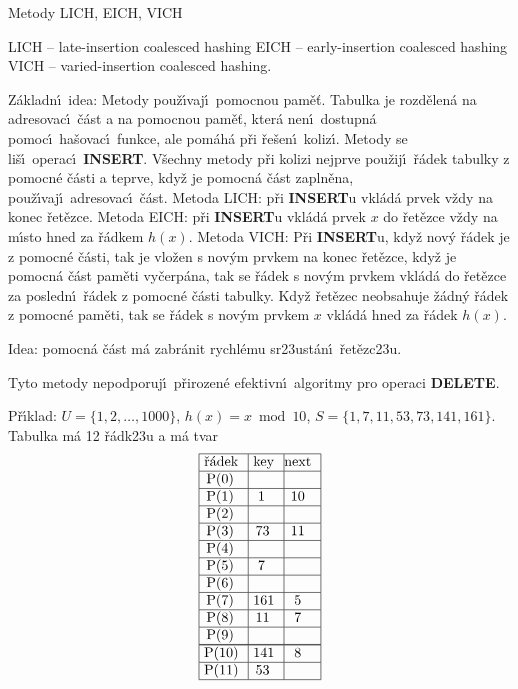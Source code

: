 \subhead
Metody LICH, EICH, VICH
\endsubhead

\phantom{---}LICH -- late-insertion coalesced hashing\newline 
\phantom{---}EICH -- early-insertion coalesced hashing\newline 
\phantom{---}VICH -- varied-insertion coalesced hashing.
\medskip

\flushpar Z\'akladn\'\i\ idea: Metody pou\v z\'\i vaj\'\i\ pomocnou pam\v e\v t. 
Tabulka je rozd\v elen\'a na adresovac\'\i\ \v c\'ast a na pomocnou 
pam\v e\v t, kter\'a nen\'\i\ dostupn\'a pomoc\'\i\ ha\v sovac\'\i\ funkce, 
ale pom\'ah\'a p\v ri \v re\v sen\'\i\ koliz\'\i . Metody se li\v s\'\i\ operac\'\i\ 
{\bf INSERT}. V\v sechny metody p\v ri kolizi nejprve pou\v zij\'\i\ \v r\'adek 
tabulky z pomocn\'e \v c\'asti a teprve, kdy\v z je pomocn\'a \v c\'ast 
zapln\v ena, pou\v z\'\i vaj\'\i\ adresovac\'\i\ \v c\'ast.\newline 
Metoda LICH: p\v ri {\bf INSERT}u vkl\'ad\'a prvek v\v zdy na konec 
\v re\-t\v ez\-ce.\newline 
Metoda EICH: p\v ri {\bf INSERT}u vkl\'ad\'a prvek $x$ do \v ret\v ezce v\v zdy 
na m\'\i sto hned za \v r\'adkem $h(x)$.\newline 
Metoda VICH: P\v ri {\bf INSERT}u, kdy\v z nov\'y \v r\'adek je z 
pomocn\'e \v c\'asti, tak je vlo\v zen s nov\'ym prvkem na konec 
\v ret\v ezce, kdy\v z je pomocn\'a \v c\'ast pam\v eti vy\v cer\-p\'a\-na, tak se 
\v r\'adek s nov\'ym prvkem vkl\'ad\'a do \v ret\v ezce za posled\-n\'\i\ 
\v r\'adek z pomocn\'e \v c\'asti tabulky. Kdy\v z \v ret\v ezec neobsahuje 
\v z\'adn\'y \v r\'adek z pomocn\'e pam\v eti, tak se \v r\'adek s nov\'ym  prvkem $x$ vkl\'ad\'a hned za \v r\'adek $h(x)$. 
\medskip

\flushpar Idea: pomocn\'a \v c\'ast m\'a zabr\'anit rychl\'emu 
sr\accent23ust\'an\'\i\ \v ret\v ezc\accent23u.
\medskip

\flushpar Tyto metody nepodporuj\'\i\ p\v rirozen\'e efektivn\'\i\ algoritmy 
pro ope\-raci {\bf DELETE}.

\flushpar P\v r\'\i klad: $U=\{1,2,\dots,1000\}$, $h(x)=x\bmod10$,\newline 
$S=\{1,7,11,53,73,141,161\}$. Tabulka m\'a 12 \v r\'adk\accent23u a 
m\'a tvar
$$\vtop{\offinterlineskip\halign {\strut\vrule\ # & \vrule\ # & \vrule \hfil # \hfil \vrule\cr\noalign{\hrule}\v r\'adek & key & next \hfil \cr\noalign{\hrule}P(0) & &\hfill \cr\noalign{\hrule}P(1) & 1 & 10 \cr\noalign{\hrule}P(2) & &\hfill \cr\noalign{\hrule}P(3) & 73 & 11 \cr\noalign{\hrule}P(4) &  &\hfill \cr\noalign{\hrule}P(5) & 7 & \hfill \cr\noalign{\hrule}P(6) & &\hfill \cr\noalign{\hrule}P(7) & 161 & 5 \cr\noalign{\hrule}P(8) & 11 & 7 \cr\noalign{\hrule}P(9) & &\hfill \cr\noalign{\hrule}\noalign{\hrule}P(10) & 141 & 8 \cr\noalign{\hrule}P(11) & 53 & \cr\noalign{\hrule}}}$$


